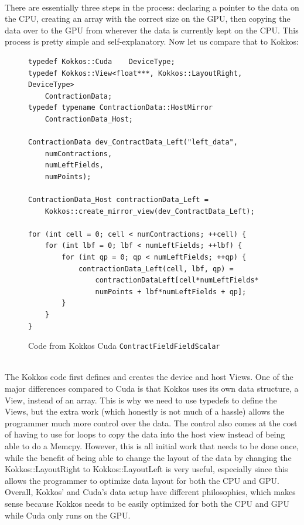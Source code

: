 \\
There are essentially three steps in the process: declaring a pointer to the
data on the CPU, creating an array with the correct size on the GPU, then
copying the data over to the GPU from wherever the data is currently kept on the
CPU. This process is pretty simple and self-explanatory. Now let us compare that
to Kokkos: \\
\begin{figure}[!htb]
	\begin{lstlisting}
typedef Kokkos::Cuda	DeviceType;
typedef Kokkos::View<float***, Kokkos::LayoutRight, DeviceType>
	ContractionData;
typedef typename ContractionData::HostMirror
	ContractionData_Host;

ContractionData dev_ContractData_Left("left_data",
	numContractions,
	numLeftFields,
	numPoints);

ContractionData_Host contractionData_Left = 
	Kokkos::create_mirror_view(dev_ContractData_Left);

for (int cell = 0; cell < numContractions; ++cell) {
	for (int lbf = 0; lbf < numLeftFields; ++lbf) {
		for (int qp = 0; qp < numLeftFields; ++qp) {
			contractionData_Left(cell, lbf, qp) = 
				contractionDataLeft[cell*numLeftFields*
				numPoints + lbf*numLeftFields + qp];
		}
	}
}
	\end{lstlisting}
\caption{Code from Kokkos Cuda \texttt{ContractFieldFieldScalar}
\label{lst:ContractFieldFieldScalar Kokkos Cuda Data Setup}}
\end{figure}
\\
The Kokkos code first defines and creates the device and host Views. One of the major differences compared to Cuda is that Kokkos uses its own data structure, a View, instead of an array. This is why we need to use typedefs to define the Views, but the extra work (which honestly is not much of a hassle) allows the programmer much more control over the data. The control also comes at the cost of having to use for loops to copy the data into the host view instead of being able to do a Memcpy. However, this is all initial work that needs to be done once, while the benefit of being able to change the layout of the data by changing the Kokkos::LayoutRight to Kokkos::LayoutLeft is very useful, especially since this allows the programmer to optimize data layout for both the CPU and GPU. Overall, Kokkos' and Cuda's data setup have different philosophies, which makes sense because Kokkos needs to be easily optimized for both the CPU and GPU while Cuda only runs on the GPU. \\

